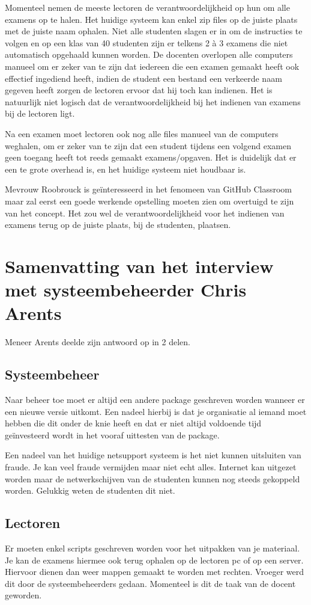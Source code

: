 Momenteel nemen de meeste lectoren de verantwoordelijkheid op hun om alle examens op te halen. Het huidige systeem kan enkel zip files op de juiste plaats met de juiste naam ophalen. Niet alle studenten slagen er in om de instructies te volgen en op een klas van 40 studenten zijn er telkens 2 à 3 examens die niet automatisch opgehaald kunnen worden. De docenten overlopen alle computers manueel om er zeker van te zijn dat iedereen die een examen gemaakt heeft ook effectief ingediend heeft, indien de student een bestand een verkeerde naam gegeven heeft zorgen de lectoren ervoor dat hij toch kan indienen. Het is natuurlijk niet logisch dat de verantwoordelijkheid bij het indienen van examens bij de lectoren ligt.

Na een examen moet lectoren ook nog alle files manueel van de computers weghalen, om er zeker van te zijn dat een student tijdens een volgend examen geen toegang heeft tot reeds gemaakt examens/opgaven. Het is duidelijk dat er een te grote overhead is, en het huidige systeem niet houdbaar is.

Mevrouw Roobrouck is geïnteresseerd in het fenomeen van GitHub Classroom maar zal eerst een goede werkende opstelling moeten zien om overtuigd te zijn van het concept. Het zou wel de verantwoordelijkheid voor het indienen van examens terug op de juiste plaats, bij de studenten, plaatsen. \newpage

\section{Samenvatting van het interview met systeembeheerder Chris Arents}

Meneer Arents deelde zijn antwoord op in 2 delen. 
\subsection{Systeembeheer}

Naar beheer toe moet er altijd een andere package  geschreven worden wanneer er een nieuwe versie uitkomt. Een nadeel hierbij is dat je organisatie al iemand moet hebben die dit onder de knie heeft en dat er niet altijd voldoende tijd geïnvesteerd wordt in het vooraf uittesten van de package.

Een nadeel van het huidige netsupport systeem is het niet kunnen uitsluiten van fraude. Je kan veel fraude vermijden maar niet echt alles. Internet kan uitgezet worden maar de netwerkschijven van de studenten kunnen nog steeds gekoppeld worden. Gelukkig weten de studenten dit niet.

\subsection{Lectoren}

Er moeten enkel scripts geschreven worden voor het uitpakken van je materiaal. Je kan de examens hiermee ook terug ophalen op de lectoren pc of op een server. Hiervoor dienen dan weer mappen gemaakt te worden met rechten. Vroeger werd dit door de systeembeheerders gedaan. Momenteel is dit de taak van de docent geworden.